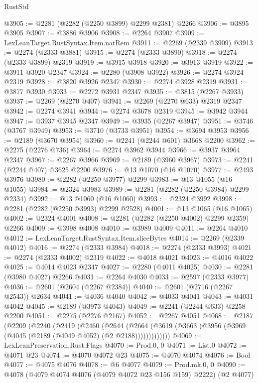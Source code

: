 \begin{lexlean}{RustStd}
\begin{coremodule}
@3905 := @2281 (@2282 (@2250 @3899) @2299 @2381) @2266
@3906 := @3895 @3905
@3907 := @3886 @3906
@3908 := @2264 @3907
@3909 := LexLeanTarget.RustSyntax.Item.natRem
@3911 := @2269 (@2339 @3909)
@3913 := @2274 (@2333 @3881)
@3915 := @2274 (@2333 @3890)
@3918 := @2274 (@2333 @3899) @2319
@3919 := @3915 @3918
@3920 := @3913 @3919
@3922 := @3911 @3920 @2347
@3924 := @2280 (@3908 @3922)
@3926 := @2274 @3924 @2319
@3928 := @3820 @3926 @2347
@3930 := @2274 @3928 @2319
@3931 := @3877 @3930
@3933 := @2272 @3931 @2347
@3935 := @3815 (@2267 @3933)
@3937 := @2269 (@2270 @407)
@3941 := @2269 (@2270 @633) @2319 @2347
@3942 := @2274 @3941
@3944 := @2274 @3678 @2319
@3945 := @3942 @3944
@3947 := @3937 @3945 @2347
@3949 := @3935 (@2267 @3947)
@3951 := @3746 (@3767 @3949)
@3953 := @3710 (@3733 @3951)
@3954 := @3694 @3953
@3956 := @2189 (@3670 @3954)
@3960 := @2241 (@2244 @601) @3668 @2200
@3962 := @2275 (@2276 @736)
@3964 := @2274 @3962 @3944
@3966 := @3937 @3964 @2347
@3967 := @2267 @3966
@3969 := @2189 (@3960 @3967)
@3973 := @2241 (@2244 @407) @3625 @2200
@3976 := @13 @1070 (@16 @1070)
@3977 := @2493 @3976
@3980 := @2282 (@2250 @3977) @2299
@3983 := @13 @1055 (@16 @1055)
@3984 := @2324 @3983
@3989 := @2281 (@2282 (@2250 @3984) @2299 @2334)
@3992 := @13 @1060 (@16 @1060)
@3993 := @2324 @3992
@3998 := @2281 (@2282 (@2250 @3993) @2299 @2528)
@4001 := @13 @1065 (@16 @1065)
@4002 := @2324 @4001
@4008 := @2281 (@2282 (@2250 @4002) @2299 @2359) @2266
@4009 := @3998 @4008
@4010 := @3989 @4009
@4011 := @2264 @4010
@4012 := LexLeanTarget.RustSyntax.Item.sliceBytes
@4014 := @2269 (@2339 @4012)
@4016 := @2274 (@2333 @3984)
@4018 := @2274 (@2333 @3993)
@4021 := @2274 (@2333 @4002) @2319
@4022 := @4018 @4021
@4023 := @4016 @4022
@4025 := @4014 @4023 @2347
@4027 := @2280 (@4011 @4025)
@4030 := @2281 (@3980 @4027) @2266
@4031 := @2264 @4030
@4033 := @2597 (@2333 @3977)
@4036 := @2601 (@2604 (@2267 @2384))
@4040 := @2601 (@2716 (@2267 @2543)) @2634
@4041 := @4036 @4040
@4042 := @4033 @4041
@4043 := @4031 @4042
@4045 := @2189 (@3973 @4043)
@4049 := @2241 (@2244 @633) @2258 @2200
@4051 := @2275 (@2276 @2167)
@4052 := @2267 @4051
@4068 := @2187
    (@2209
      (@2240
        (@2419
          (@2460
            (@2644
              (@2664 (@3619 (@3663 (@3956 (@3969 (@4045 (@2189 (@4049 @4052) (@2 @2188)))))))))))))
@4069 := LexLeanPreservation.Rust.Flags
@4070 := Prod.{0, 0}
@4071 := List.{0}
@4072 := @4071 @23
@4074 := @4070 @4072 @23
@4075 := @4070 @4074
@4076 := Bool
@4077 := @4075 @4076
@4078 := @6 @4077
@4079 := Prod.mk.{0, 0}
@4090 := @4078 (@4079 @4074 @4076 (@4079 @4072 @23 @156 @159) @2222) (@2 @4077)

\end{coremodule}
\end{lexlean}
